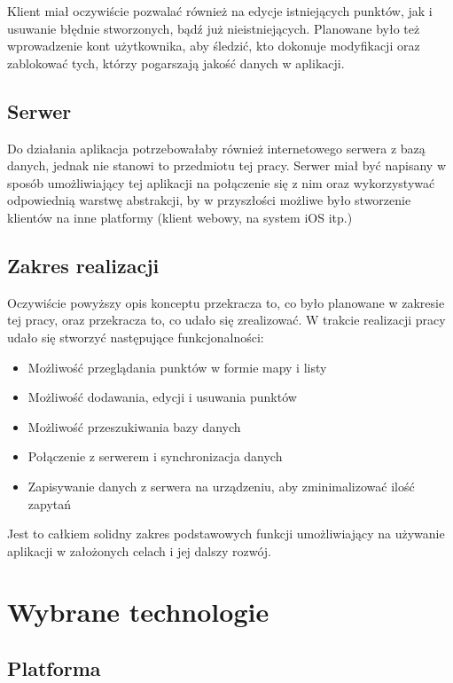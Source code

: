 \documentclass[polish,polish,a4paper,12pt]{article}
\let\sectioncmd\section
\renewcommand{\section}{\clearpage\sectioncmd}
\begin{document}
	Klient miał oczywiście pozwalać również na edycje istniejących punktów, jak i usuwanie błędnie stworzonych, bądź już nieistniejących. Planowane było też wprowadzenie kont użytkownika, aby śledzić, kto dokonuje modyfikacji oraz zablokować tych, którzy pogarszają jakość danych w aplikacji.

	\subsection{Serwer}

	Do działania aplikacja potrzebowałaby również internetowego serwera z bazą danych, jednak nie stanowi to przedmiotu tej pracy. Serwer miał być napisany w sposób umożliwiający tej aplikacji na połączenie się z nim oraz wykorzystywać odpowiednią warstwę abstrakcji, by w przyszłości możliwe było stworzenie klientów na inne platformy (klient webowy, na system iOS itp.)

	\subsection{Zakres realizacji}

	Oczywiście powyższy opis konceptu przekracza to, co było planowane w zakresie tej pracy, oraz przekracza to, co udało się zrealizować. W trakcie realizacji pracy udało się stworzyć następujące funkcjonalności:

	\begin{itemize}
		\item Możliwość przeglądania punktów w formie mapy i listy
		\item Możliwość dodawania, edycji i usuwania punktów
		\item Możliwość przeszukiwania bazy danych
		\item Połączenie z serwerem i synchronizacja danych
		\item Zapisywanie danych z serwera na urządzeniu, aby zminimalizować ilość zapytań
	\end{itemize}

	Jest to całkiem solidny zakres podstawowych funkcji umożliwiający na używanie aplikacji w założonych celach i jej dalszy rozwój.

\section{Wybrane technologie}\label{technology}
	\subsection{Platforma}
\end{document}
